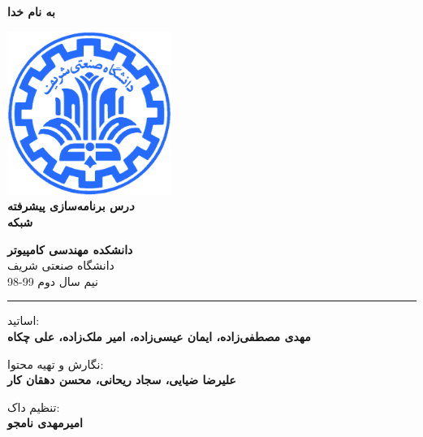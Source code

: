 \documentclass[]{article}
\begin{document}
\begin{titlepage}
\begin{center}

\textbf{ \Huge{به نام خدا} }
        
\vspace{0.2cm}

\includegraphics[width=0.4\textwidth]{sharif1.png}\\
\vspace{0.2cm}
\textbf{ \Huge{\emph درس برنامه‌سازی پیشرفته} }\\
\vspace{0.25cm}
\textbf{ \Large{شبکه} }
\vspace{0.2cm}
       
 
      \large \textbf{دانشکده مهندسی کامپیوتر}\\\vspace{0.1cm}
    \large   دانشگاه صنعتی شریف\\\vspace{0.2cm}
       \large   ﻧﯿﻢ سال دوم 99-98 \\\vspace{0.10cm}
      \noindent\rule[1ex]{\linewidth}{1pt}
اساتید:\\
    \textbf{{مهدی مصطفی‌زاده، ایمان عیسی‌زاده، امیر ملک‌زاده، علی چکاه}}



        \vspace{0.10cm}
نگارش و تهیه محتوا:\\
    \textbf{{علیرضا ضیایی، سجاد ریحانی، محسن دهقان کار}}
    
       \vspace{0.10cm}
       تنظیم داک:\\
    \textbf{{امیرمهدی نامجو}}

    
        \vspace{0.05cm}
    

\end{center}
\end{titlepage}
\end{document}
